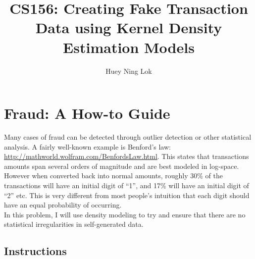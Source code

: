 \documentclass[11pt]{article}
\title{CS156: Creating Fake Transaction Data using Kernel Density Estimation Models}
\author{Huey Ning Lok}
\begin{document}
    
    
    \maketitle
    
    \section*{Fraud: A How-to Guide}

Many cases of fraud can be detected through outlier detection or other
statistical analysis. A fairly well-known example is Benford's law:
\url{http://mathworld.wolfram.com/BenfordsLaw.html}. This states that
transactions amounts span several orders of magnitude and are best
modeled in log-space. However when converted back into normal amounts,
roughly 30\% of the transactions will have an initial digit of ``1'',
and 17\% will have an initial digit of ``2'' etc. This is very different
from most people's intuition that each digit should have an equal
probability of occurring.\\

In this problem, I will use density modeling to try and ensure that
there are no statistical irregularities in self-generated data.

\subsection*{Instructions}
\end{document}
